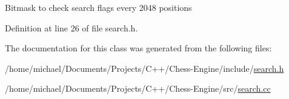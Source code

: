 Bitmask to check search flags every 2048 positions 

Definition at line 26 of file search.\+h.



The documentation for this class was generated from the following files\+:\begin{DoxyCompactItemize}
\item 
/home/michael/\+Documents/\+Projects/\+C++/\+Chess-\/\+Engine/include/\mbox{\hyperlink{search_8h}{search.\+h}}\item 
/home/michael/\+Documents/\+Projects/\+C++/\+Chess-\/\+Engine/src/\mbox{\hyperlink{search_8cc}{search.\+cc}}\end{DoxyCompactItemize}
